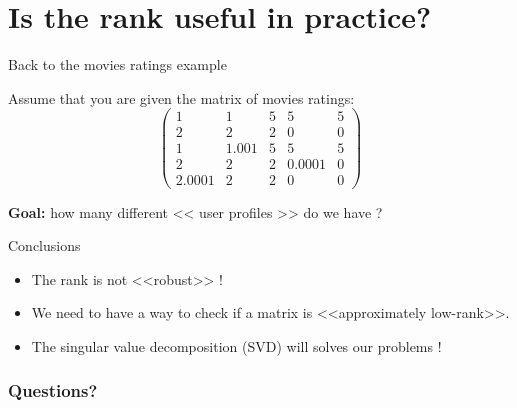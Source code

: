 \documentclass{beamer}
\begin{document}
\section{Is the rank useful in practice?}

\begin{frame}[t]{Back to the movies ratings example}
	\grid

	\vspace{-0.3cm}
	Assume that you are given the matrix of movies ratings:
	$$
	\begin{pmatrix}
		1 & 1 & 5 & 5 & 5 \\
		2 & 2 & 2 & 0 & 0 \\
		1 & 1.001 & 5 & 5 & 5 \\
		2 & 2 & 2 & 0.0001 & 0 \\
		2.0001 & 2 & 2 & 0 & 0 
	\end{pmatrix}
	$$

	\vspace{0.5cm}
	\textbf{Goal:} how many different << user profiles >> do we have ?
\end{frame}



\begin{frame}[t]{Conclusions}
	\grid

	\begin{itemize}
		\item The rank is not <<robust>> !
		\item We need to have a way to check if a matrix is <<approximately low-rank>>.
		\item The singular value decomposition (SVD) will solves our problems !
	\end{itemize}
\end{frame}


\appendix
\backupbegin
\begin{frame}
	\frametitle{Questions?}
	\pause
	\pause
\end{frame}
\backupend
\end{document}
